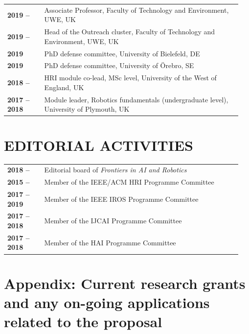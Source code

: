\documentclass[11pt,a4paper]{report}
\begin{document}
\begin{tabular}{p{0.15\linewidth}p{0.8\linewidth}}
    \bf 2019 -- & Associate Professor, Faculty of Technology and Environment, UWE, UK \\
    \bf 2019 -- & Head of the Outreach cluster, Faculty of Technology and Environment, UWE, UK \\
    \bf 2019 & PhD defense committee, University of Bielefeld, DE \\
    \bf 2019 & PhD defense committee, University of Örebro, SE \\
    \bf 2018 -- & HRI module co-lead, MSc level, University of the West of England, UK  \\
    \bf 2017 -- 2018 & Module leader, Robotics fundamentals (undergraduate level), University of Plymouth, UK \\
\end{tabular}

\section{EDITORIAL ACTIVITIES}

\begin{tabular}{p{0.15\linewidth}p{0.8\linewidth}}
    \bf 2018 -- & Editorial board of \emph{Frontiers in AI and Robotics} \\
    \bf 2015 --  & Member of the IEEE/ACM HRI Programme Committee \\
    \bf 2017 -- 2019 & Member of the IEEE IROS Programme Committee  \\
    \bf 2017 -- 2018 & Member of the IJCAI Programme Committee  \\
    \bf 2017 -- 2018 & Member of the HAI Programme Committee  \\
\end{tabular}




\newpage

\section{Appendix: Current research grants and any on-going applications related
to the proposal}
\end{document}
